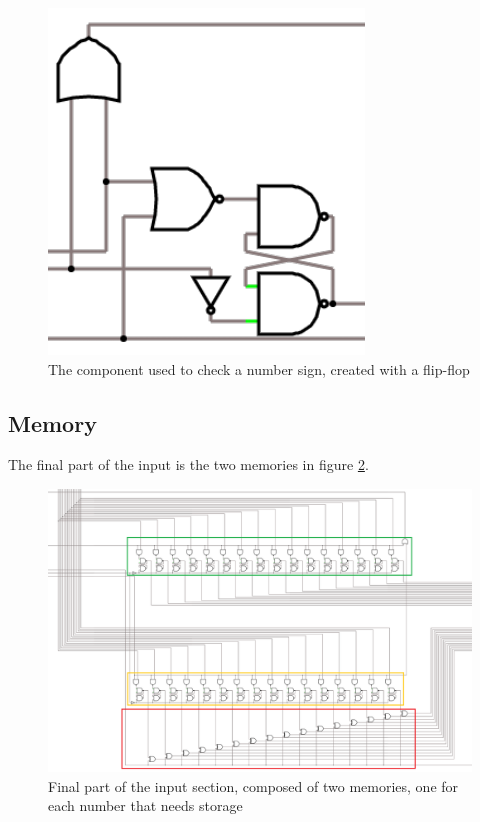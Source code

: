 \documentclass{article}
\begin{document}
\begin{figure}[h]
    \centering
    \includegraphics[scale=.5]{IM_SignBit}
    \caption{The component used to check a number sign, created with a flip-flop}
    \label{SignBit}
\end{figure}

\clearpage
\subsection{Memory}
The final part of the input is the two memories in figure \ref{Memories}.

\begin{figure}[h]
    \centering  
    \includegraphics[scale=.4]{IM_Memories.PNG}
    \caption{Final part of the input section, composed of two memories, one for each number that needs storage}
    \label{Memories}
\end{figure}
\end{document}
